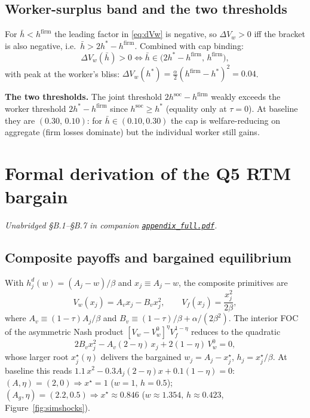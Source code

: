 \documentclass[a4paper,11pt]{article}
\begin{document}
\subsection{Worker-surplus band and the two thresholds}\label{app:q4-worker-band}
For $\bar h<h^{\mathrm{firm}}$ the leading factor in \eqref{eq:dVw} is negative, so $\Delta V_w>0$ iff the bracket is also negative, i.e.\ $\bar h>2h^{*}-h^{\mathrm{firm}}$. Combined with cap binding:
\begin{equation}
\Delta V_w(\bar h)>0\iff \bar h\in\bigl(2h^{*}-h^{\mathrm{firm}},\,h^{\mathrm{firm}}\bigr),
\label{eq:cap-worker-band}
\end{equation}
with peak at the worker's bliss: $\Delta V_w(h^{*})=\tfrac{\alpha}{2}(h^{\mathrm{firm}}-h^{*})^{2}=0.04$.

\textbf{The two thresholds.} The joint threshold $2h^{\mathrm{soc}}-h^{\mathrm{firm}}$ weakly exceeds the worker threshold $2h^{*}-h^{\mathrm{firm}}$ since $h^{\mathrm{soc}}\!\ge\!h^{*}$ (equality only at $\tau\!=\!0$). At baseline they are $(0.30,\,0.10)$: for $\bar h\!\in\!(0.10,0.30)$ the cap is welfare-reducing on aggregate (firm losses dominate) but the individual worker still gains.

\section{Formal derivation of the Q5 RTM bargain}\label{app:q5}

\noindent\emph{Unabridged \S B.1--\S B.7 in companion \href{https://github.com/AlessandroCaggia30/overworked-americans-takehome/blob/main/appendix_full.pdf}{\texttt{appendix\_full.pdf}}.}

\subsection{Composite payoffs and bargained equilibrium}
With $h^d_j(w)=(A_j-w)/\beta$ and $x_j\equiv A_j-w$, the composite primitives are
\[
V_w(x_j)=A_v x_j-B_v x_j^{2},\qquad V_f(x_j)=\frac{x_j^{2}}{2\beta},
\]
where $A_v\!\equiv\!(1-\tau)A_j/\beta$ and $B_v\!\equiv\!(1-\tau)/\beta+\alpha/(2\beta^{2})$. The interior FOC of the asymmetric Nash product $[V_w-V_w^{0}]^{\eta}V_f^{1-\eta}$ reduces to the quadratic
\begin{equation}
2B_v x_j^{2}-A_v(2-\eta)\,x_j+2(1-\eta)\,V_w^{0}=0,
\label{eq:rtm-quad}
\end{equation}
whose larger root $x_j^{\star}(\eta)$ delivers the bargained $w_j=A_j-x_j^{\star}$, $h_j=x_j^{\star}/\beta$. At baseline this reads $1.1\,x^{2}-0.3A_j(2-\eta)x+0.1(1-\eta)=0$: $(A,\eta)=(2,0)\Rightarrow x^{\star}=1$ ($w=1,\,h=0.5$); $(A_g,\eta)=(2.2,0.5)\Rightarrow x^{\star}\!\approx\!0.846$ ($w\!\approx\!1.354,\,h\!\approx\!0.423$, Figure~\ref{fig:simshocks}).
\end{document}
